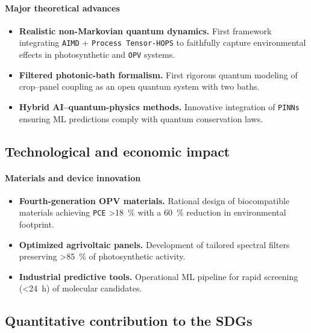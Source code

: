 \documentclass[12pt, a4paper]{article}
\begin{document}
\paragraph{Major theoretical advances}
\begin{itemize}
    \item \textbf{Realistic non-Markovian quantum dynamics.} First framework integrating \texttt{AIMD} + \texttt{Process Tensor-HOPS} to faithfully capture environmental effects in photosynthetic and \texttt{OPV} systems.
    
    \item \textbf{Filtered photonic-bath formalism.} First rigorous quantum modeling of crop–panel coupling as an open quantum system with two baths.
    
    \item \textbf{Hybrid AI–quantum-physics methods.} Innovative integration of \texttt{PINNs} ensuring ML predictions comply with quantum conservation laws.
\end{itemize}

\subsection{Technological and economic impact}

\paragraph{Materials and device innovation}
\begin{itemize}
    \item \textbf{Fourth-generation OPV materials.} Rational design of biocompatible materials achieving \texttt{PCE} \SI{>18}{\percent} with a \SI{60}{\percent} reduction in environmental footprint.
    
    \item \textbf{Optimized agrivoltaic panels.} Development of tailored spectral filters preserving \SI{>85}{\percent} of photosynthetic activity.
    
    \item \textbf{Industrial predictive tools.} Operational ML pipeline for rapid screening (\SI{<24}{\hour}) of molecular candidates.
\end{itemize}

\subsection{Quantitative contribution to the SDGs}
\end{document}
